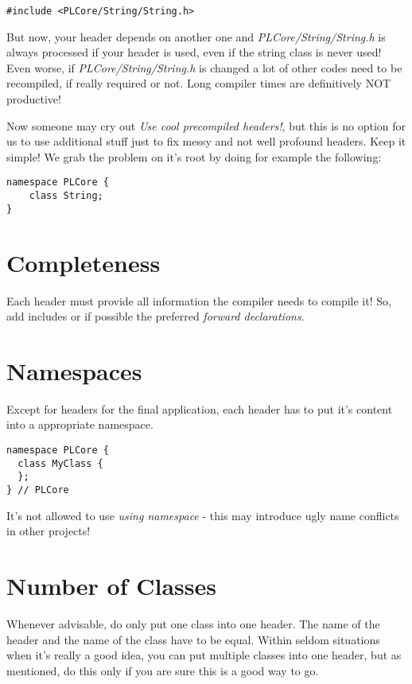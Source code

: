 \begin{lstlisting}[caption=Include]
#include <PLCore/String/String.h>
\end{lstlisting}

But now, your header depends on another one and \emph{PLCore/String/String.h} is always processed if your header is used, even if the string class is never used! Even worse, if \emph{PLCore/String/String.h} is changed a lot of other codes need to be recompiled, if really required or not. Long compiler times are definitively NOT productive!

Now someone may cry out \emph{Use cool precompiled headers!}, but this is no option for us to use additional stuff just to fix messy and not well profound headers. Keep it simple! We grab the problem on it's root by doing for example the following:

\begin{lstlisting}[caption=Forward declaration]
namespace PLCore {
    class String;
}
\end{lstlisting}




\section{Completeness}
Each header must provide all information the compiler needs to compile it! So, add includes or if possible the preferred \emph{forward declarations}.




\section{Namespaces}
Except for headers for the final application, each header has to put it's content into a appropriate namespace.

\begin{lstlisting}[caption=Namespace definition]
namespace PLCore {
  class MyClass {
  };
} // PLCore
\end{lstlisting}

It's not allowed to use \emph{using namespace} - this may introduce ugly name conflicts in other projects!




\section{Number of Classes}
Whenever advisable, do only put one class into one header. The name of the header and the name of the class have to be equal. Within seldom situations when it's really a good idea, you can put multiple classes into one header, but as mentioned, do this only if you are sure this is a good way to go.




